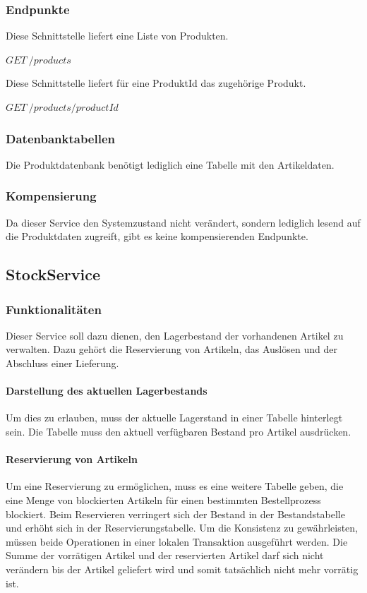 \subsubsection{Endpunkte}
Diese Schnittstelle liefert eine Liste von Produkten. 

$GET \ /products$

Diese Schnittstelle liefert für eine ProduktId das zugehörige Produkt.

$GET \ /products/{productId}$

\subsubsection{Datenbanktabellen}
Die Produktdatenbank benötigt lediglich eine Tabelle mit den Artikeldaten.

\subsubsection{Kompensierung}
Da dieser Service den Systemzustand nicht verändert, sondern lediglich lesend auf die Produktdaten zugreift, gibt es keine kompensierenden Endpunkte.

\subsection{StockService}
\subsubsection{Funktionalitäten}
Dieser Service soll dazu dienen, den Lagerbestand der vorhandenen Artikel zu verwalten. Dazu gehört die Reservierung von Artikeln, das Auslösen und der Abschluss einer Lieferung. 
\paragraph{Darstellung des aktuellen Lagerbestands}
Um dies zu erlauben, muss der aktuelle Lagerstand in einer Tabelle hinterlegt sein. Die Tabelle muss den aktuell verfügbaren Bestand pro Artikel ausdrücken. 
\paragraph{Reservierung von Artikeln}
Um eine Reservierung zu ermöglichen, muss es eine weitere Tabelle geben, die eine Menge von blockierten Artikeln für einen bestimmten Bestellprozess blockiert. Beim Reservieren verringert sich der Bestand in der Bestandstabelle und erhöht sich in der Reservierungstabelle. Um die Konsistenz zu gewährleisten, müssen beide Operationen in einer lokalen Transaktion ausgeführt werden. Die Summe der vorrätigen Artikel und der reservierten Artikel darf sich nicht verändern bis der Artikel geliefert wird und somit tatsächlich nicht mehr vorrätig ist.
